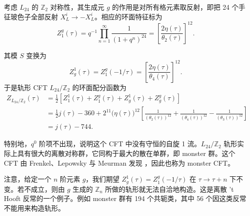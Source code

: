考虑 $L_{24}$ 的 $\mathbb{Z}_2$ 对称性，其生成元 $g$ 的作用是对所有格元素取反射，即把 24 个手征玻色子全部反射 $X^i_L\to-X^i_L$。相应的环面特征标为
\begin{equation}
  \label{eq:4-9}
  Z^g_1(\tau)=q^{-1}\prod_{n=1}^{\infty}\frac{1}{(1+q^n)^{24}}=\left[\frac{2\eta(\tau)}{\theta_2(\tau)}\right]^{12}.
\end{equation}


其模 $S$ 变换为
\begin{equation}
  \label{eq:4-10}
  Z^1_g(\tau)=Z^g_1(-1/\tau)=\left[\frac{2\eta(\tau)}{\theta_4(\tau)}\right]^{12}.
\end{equation}
于是轨形 CFT $L_{24}/\mathbb{Z}_2$ 的环面配分函数为
\begin{equation}
  \label{eq:4-11}
  \begin{aligned}
  Z_{L_{24}/\mathbb{Z}_2}(\tau)&=\frac{1}{2}\left[Z^1_1(\tau)+Z^g_1(\tau)+Z^1_g(\tau)+Z^g_g(\tau)\right]\\
  &=\frac{1}{2}j(\tau)-360+2^{11}\bigl(\eta(\tau)\bigr)^{12}\left[\frac{1}{(\theta_2(\tau))^{12}}+\frac{1}{(\theta_4(\tau))^{12}}-\frac{1}{(\theta_3(\tau))^{12}}\right]\\
  &=j(\tau)-744.
  \end{aligned}
\end{equation}


特别地，$q^0$ 阶项不出现，说明这个 CFT 中没有守恒的自旋 1 流。$L_{24}/\mathbb{Z}_2$ 轨形实际上具有很大的离散对称群，它同构于最大的散在单群，即 monster 群。这个 CFT 由 Frenkel、Lepowsky 与 Meurman 发现 \cite{r20}，因此也称为 monster CFT。

注意，给定一个 $n$ 阶元素 $g$，我们期望 $Z^1_g(\tau)=Z^g_1(-1/\tau)$ 在 $\tau\to\tau+n$ 下不变。若不成立，则由 $g$ 生成的 $\mathbb{Z}_n$ 所做的轨形就无法自洽地构造。这是离散 't Hooft 反常的一个例子。例如 monster 群有 194 个共轭类，其中 56 个因这类反常不能用来构造轨形。

